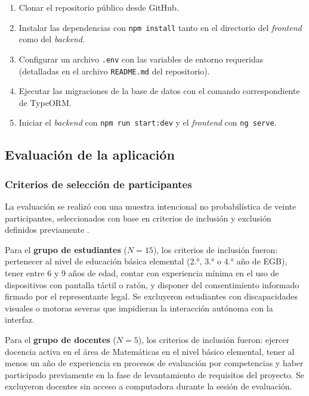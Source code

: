\begin{enumerate}[leftmargin=*, label=\arabic*.]
  \item Clonar el repositorio público desde GitHub.
  \item Instalar las dependencias con \texttt{npm install} tanto en el directorio del \textit{frontend} como del \textit{backend}.
  \item Configurar un archivo \texttt{.env} con las variables de entorno requeridas (detalladas en el archivo \texttt{README.md} del repositorio).
  \item Ejecutar las migraciones de la base de datos con el comando correspondiente de TypeORM.
  \item Iniciar el \textit{backend} con \texttt{npm run start:dev} y el \textit{frontend} con \texttt{ng serve}.
\end{enumerate}

\subsection{Evaluación de la aplicación}
\subsubsection*{Criterios de selección de participantes}

La evaluación se realizó con una muestra intencional no probabilística de
veinte participantes, seleccionados con base en criterios de inclusión y
exclusión definidos previamente \cite{vlachogianni2022sus}.

Para el \textbf{grupo de estudiantes} ($N = 15$), los criterios de inclusión fueron: pertenecer al nivel de educación básica elemental (2.°, 3.° o 4.° año de EGB), tener entre 6 y 9 años de edad, contar con experiencia mínima en el uso de dispositivos con pantalla táctil o ratón, y disponer del consentimiento informado firmado por el representante legal. Se excluyeron estudiantes con discapacidades visuales o motoras severas que impidieran la interacción autónoma con la interfaz.

Para el \textbf{grupo de docentes} ($N = 5$), los criterios de inclusión fueron: ejercer docencia activa en el área de Matemáticas en el nivel básico elemental, tener al menos un año de experiencia en procesos de evaluación por competencias y haber participado previamente en la fase de levantamiento de requisitos del proyecto. Se excluyeron docentes sin acceso a computadora durante la sesión
de evaluación.

